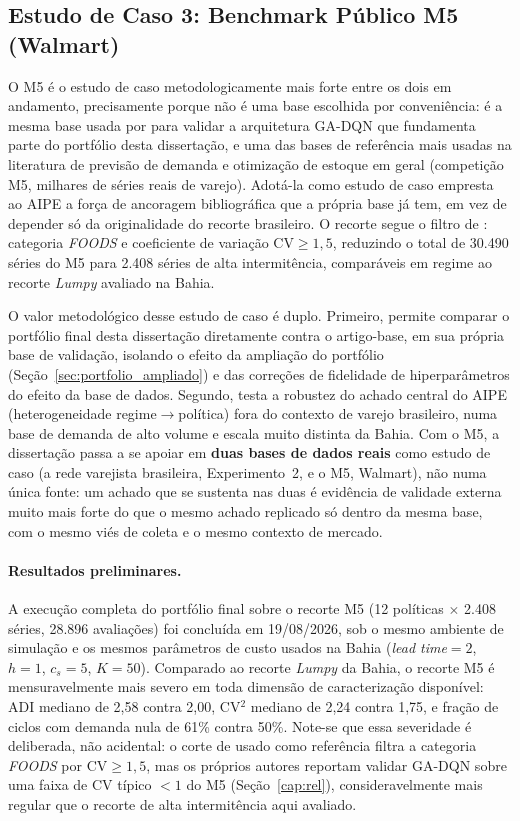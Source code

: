 \subsection{Estudo de Caso 3: Benchmark Público M5 (Walmart)}

O M5 é o estudo de caso metodologicamente mais forte entre os dois em andamento, precisamente porque não é uma base escolhida por conveniência: é a mesma base usada por \citet{Zabraoui2025GaDQN} para validar a arquitetura GA-DQN que fundamenta parte do portfólio desta dissertação, e uma das bases de referência mais usadas na literatura de previsão de demanda e otimização de estoque em geral (competição M5, milhares de séries reais de varejo). Adotá-la como estudo de caso empresta ao AIPE a força de ancoragem bibliográfica que a própria base já tem, em vez de depender só da originalidade do recorte brasileiro. O recorte segue o filtro de \citet{Zabraoui2025GaDQN}: categoria \textit{FOODS} e coeficiente de variação $\text{CV} \geq 1{,}5$, reduzindo o total de 30.490 séries do M5 para 2.408 séries de alta intermitência, comparáveis em regime ao recorte \textit{Lumpy} avaliado na Bahia.

O valor metodológico desse estudo de caso é duplo. Primeiro, permite comparar o portfólio final desta dissertação diretamente contra o artigo-base, em sua própria base de validação, isolando o efeito da ampliação do portfólio (Seção~\ref{sec:portfolio_ampliado}) e das correções de fidelidade de hiperparâmetros do efeito da base de dados. Segundo, testa a robustez do achado central do AIPE (heterogeneidade regime$\rightarrow$política) fora do contexto de varejo brasileiro, numa base de demanda de alto volume e escala muito distinta da Bahia. Com o M5, a dissertação passa a se apoiar em \textbf{duas bases de dados reais} como estudo de caso (a rede varejista brasileira, Experimento~2, e o M5, Walmart), não numa única fonte: um achado que se sustenta nas duas é evidência de validade externa muito mais forte do que o mesmo achado replicado só dentro da mesma base, com o mesmo viés de coleta e o mesmo contexto de mercado.

\paragraph{Resultados preliminares.} A execução completa do portfólio final sobre o recorte M5 (12 políticas $\times$ 2.408 séries, 28.896 avaliações) foi concluída em 19/08/2026, sob o mesmo ambiente de simulação e os mesmos parâmetros de custo usados na Bahia (\textit{lead time}$=2$, $h=1$, $c_s=5$, $K=50$). Comparado ao recorte \textit{Lumpy} da Bahia, o recorte M5 é mensuravelmente mais severo em toda dimensão de caracterização disponível: ADI mediano de 2,58 contra 2,00, CV$^2$ mediano de 2,24 contra 1,75, e fração de ciclos com demanda nula de 61\% contra 50\%. Note-se que essa severidade é deliberada, não acidental: o corte de \citet{Zabraoui2025GaDQN} usado como referência filtra a categoria \textit{FOODS} por CV$\geq 1{,}5$, mas os próprios autores reportam validar GA-DQN sobre uma faixa de CV típico $<1$ do M5 (Seção~\ref{cap:rel}), consideravelmente mais regular que o recorte de alta intermitência aqui avaliado.

